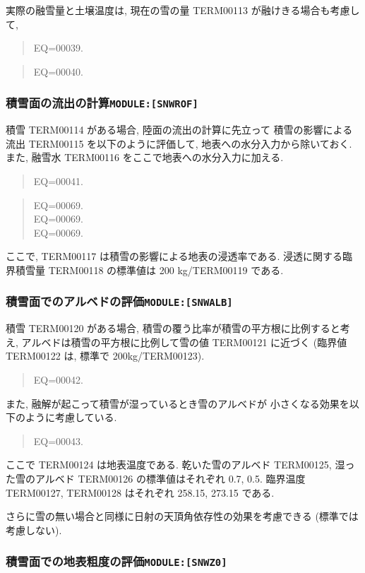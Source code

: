 実際の融雪量と土壌温度は, 現在の雪の量 TERM00113 が融けきる場合も考慮して, 
\begin{quote}
EQ=00039.
\end{quote}
\begin{quote}
EQ=00040.
\end{quote}

\subsubsection{積雪面の流出の計算\texttt{MODULE:[SNWROF]}}
 
積雪 TERM00114 がある場合, 陸面の流出の計算に先立って
積雪の影響による流出 TERM00115 を以下のように評価して, 
地表への水分入力から除いておく. 
また, 融雪水 TERM00116 をここで地表への水分入力に加える. 
\begin{quote}
EQ=00041.
\end{quote}
\begin{quote}
EQ=00069.\\
EQ=00069.\\
EQ=00069.
\end{quote}
ここで, TERM00117 は積雪の影響による地表の浸透率である. 
浸透に関する臨界積雪量 TERM00118 の標準値は 200 kg/TERM00119 である. 

\subsubsection{積雪面でのアルベドの評価\texttt{MODULE:[SNWALB]}}

積雪 TERM00120 がある場合, 
積雪の覆う比率が積雪の平方根に比例すると考え,
アルベドは積雪の平方根に比例して雪の値 TERM00121 に近づく
(臨界値 TERM00122 は, 標準で 200kg/TERM00123).
%
\begin{quote}
EQ=00042.
\end{quote}

また, 融解が起こって積雪が湿っているとき雪のアルベドが
小さくなる効果を以下のように考慮している. 
\begin{quote}
EQ=00043.
\end{quote}
ここで TERM00124 は地表温度である. 
乾いた雪のアルベド TERM00125, 湿った雪のアルベド TERM00126
の標準値はそれぞれ 0.7, 0.5. 
臨界温度 TERM00127, TERM00128 はそれぞれ 258.15, 273.15 である. 

さらに雪の無い場合と同様に日射の天頂角依存性の効果を考慮できる
(標準では考慮しない). 

\subsubsection{積雪面での地表粗度の評価\texttt{MODULE:[SNWZ0]}}

